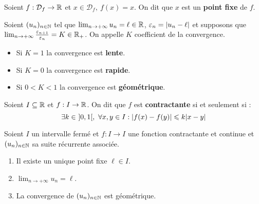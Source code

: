 \begin{definition}
	Soient $f : \mathcal{D}_f \to \mathbb{R}$ et $x \in \mathcal{D}_f,\ f(x) = x$. On dit que $x$ est un \textbf{point fixe} de $f$.
\end{definition}

\begin{definition}
    Soient $(u_n)_{n \in \mathbb{N}}$ tel que $\lim_{n \to +\infty} u_n = \ell \in \mathbb{R}$, $\varepsilon_n = \abs{u_n - \ell}$ et supposons que $\lim_{n \to +\infty} \frac{\varepsilon_{n + 1}}{\varepsilon_n} = K \in \mathbb{R}_+$. 
    On appelle $K$ coefficient de la convergence.
    \begin{itemize}
        \item Si $K = 1$ la convergence est \textbf{lente}.
        \item Si $K = 0$ la convergence est \textbf{rapide}.
        \item Si $0 < K < 1$ la convergence est \textbf{géométrique}.
    \end{itemize}
\end{definition}

\begin{definition}
	Soient $I \subseteq \mathbb{R}$ et $f : I \to \mathbb{R}$.
    On dit que $f$ est \textbf{contractante} si et seulement si :
    \[ \exists k \in \ ]0, 1[,\ \forall x, y \in I : \abs{f(x) - f(y)} \leqslant k \abs{x - y} \]
\end{definition}

\begin{theorem}
	Soient $I$ un intervalle fermé et $f : I \to I$ une fonction contractante et continue et $(u_n)_{n \in \mathbb{N}}$ sa suite récurrente associée.
	\begin{enumerate}
        \item Il existe un unique point fixe $\ell \in I$.
        \item $\lim_{n \to +\infty} u_n = \ell$.
        \item La convergence de $(u_n)_{n \in \mathbb{N}}$ est géométrique.
    \end{enumerate}
\end{theorem}

